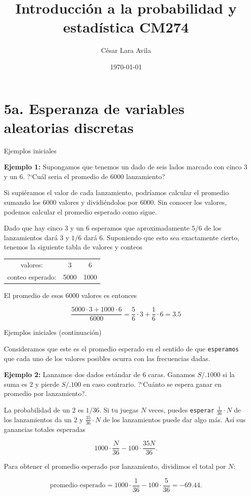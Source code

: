 \documentclass[10pt]{beamer}
\title{Introducci\'on a la probabilidad y estad\'istica CM274}
\date{\today}
\author{C\'esar Lara Avila}
\institute{\url{https://github.com/C-Lara}}
\begin{document}
  \maketitle
  \section{5a. Esperanza de variables aleatorias discretas }
  
\begin{frame}{Ejemplos iniciales}
\small {\textbf{Ejemplo 1:} Supongamos que tenemos un dado de seis lados marcado con cinco  $3$ y un $6$. ?`Cu\'al seria  el promedio de $6000$ lanzamiento?
	
Si supi\'eramos el valor de cada lanzamiento, podr\'iamos calcular el promedio sumando los $6000$ valores y dividi\'endolos por $6000$. Sin conocer los valores, podemos calcular el promedio esperado como sigue.

Dado que hay cinco $3$ y un $6$ esperamos que aproximadamente $5/6$ de los lanzamientos dar\'a $3$ y $1/6$ dar\'a $6$. Suponiendo que esto sea exactamente cierto, tenemos la siguiente tabla de valores y conteos

\begin{table}[]
	\centering
	\begin{tabular}{ccc}
		valores:        & 3    & 6    \\
		conteo esperado: & 5000 & 1000
	\end{tabular}
\end{table}

El promedio de esos $6000$ valores es entonces

\[
\frac{5000\cdot 3 + 1000\cdot 6}{6000} = \frac{5}{6}\cdot 3 + \frac{1}{6}\cdot 6 = 3.5
\]


}
\end{frame}

\begin{frame}{Ejemplos iniciales (continuaci\'on)}
\small{Consideramos que este es el promedio esperado en el sentido de que \texttt{esperamos} que cada uno de los valores posibles ocurra con las frecuencias dadas.

\textbf{Ejemplo 2:} Lanzamos dos dados est\'andar de $6$ caras. Ganamos $S/. 1000$ si la suma es $2$ y pierde $S/.100$ en caso contrario. ?`Cu\'anto se espera ganar en promedio por lanzamiento?.

La probabilidad de un $2$ es $1/36$. Si tu juegas $N$ veces, puedes \texttt{esperar} $\frac{1}{36}\cdot N$ de los lanzamientos da un $2$ y $\frac{35}{36}\cdot N$ de los lanzamientos puede dar algo m\'as. As\'i sus ganancias  totales esperadas

\[
1000\cdot \frac{N}{36} - 100\cdot \frac{35N}{36}.
\]	

Para obtener el promedio esperado por lanzamiento, dividimos el total por $N$:

\[
\text{promedio esperado} = 1000\cdot \frac{1}{36} - 100\cdot \frac{5}{36} = -69.44.
\]
}


\end{frame}
\end{document}
